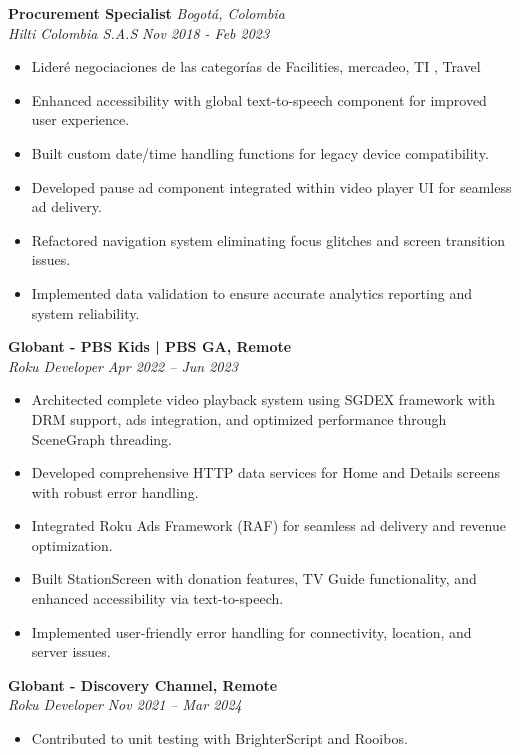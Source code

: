 \documentclass[11pt,a4paper]{article}
\newlength{\jobspacing}
\begin{document}
\textbf{Procurement Specialist} \hfill \textit{Bogotá, Colombia} \\
\emph{Hilti Colombia S.A.S} \hfill \textit{Nov 2018 - Feb 2023} \\
\begin{itemize}[leftmargin=*]
    \item Lideré negociaciones de las categorías de Facilities, mercadeo, TI , Travel 
    \item Enhanced accessibility with global text-to-speech component for improved user experience.
    \item Built custom date/time handling functions for legacy device compatibility.
    \item Developed pause ad component integrated within video player UI for seamless ad delivery.
    \item Refactored navigation system eliminating focus glitches and screen transition issues.
    \item Implemented data validation to ensure accurate analytics reporting and system reliability.
\end{itemize}

\vspace{\jobspacing}

\textbf{Globant - PBS Kids | PBS GA, Remote} \\
\emph{Roku Developer} \hfill \textit{Apr 2022 -- Jun 2023} \\
\begin{itemize}[leftmargin=*]
    \item Architected complete video playback system using SGDEX framework with DRM support, ads integration, and optimized performance through SceneGraph threading.
    \item Developed comprehensive HTTP data services for Home and Details screens with robust error handling.
    \item Integrated Roku Ads Framework (RAF) for seamless ad delivery and revenue optimization.
    \item Built StationScreen with donation features, TV Guide functionality, and enhanced accessibility via text-to-speech.
    \item Implemented user-friendly error handling for connectivity, location, and server issues.
\end{itemize}

\vspace{\jobspacing}

\textbf{Globant - Discovery Channel, Remote} \\
\emph{Roku Developer} \hfill \textit{Nov 2021 -- Mar 2024} \\
\begin{itemize}[leftmargin=*]
    \item Contributed to unit testing with BrighterScript and Rooibos.
\end{itemize}
\end{document}
